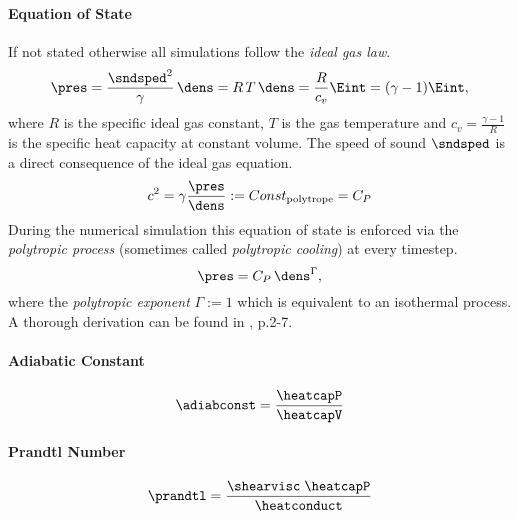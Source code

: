 \paragraph{Equation of State}
If not stated otherwise all simulations follow the \emph{ideal gas law}.
\begin{equation}
\pres = \frac{\sndsped^2}{\gamma} \, \dens = R\,T\,\dens = \frac{R}{c_v} \Eint = (\gamma - 1) \Eint,
\end{equation}
where $R$ is the specific ideal gas constant, $T$ is the gas temperature and $c_v
= \frac{\gamma - 1}{R}$ is the specific heat capacity at constant volume. The speed of sound $\sndsped$
is a direct consequence of the ideal gas equation.
\begin{equation}
c^2 = \gamma \frac{\pres}{\dens} := Const_{\text{polytrope}} = C_P
\end{equation}
During the numerical simulation this equation of state is enforced via the
\emph{polytropic process} (sometimes called \emph{polytropic cooling}) at
every timestep.
\begin{equation}
\pres = C_P \, \dens^\Gamma,
\end{equation}
where the \emph{polytropic exponent} $\Gamma := 1$ which is equivalent to an
isothermal process. A thorough derivation can be found in \cite{Horedt2004},
p.2-7.

\paragraph{Adiabatic Constant}
\begin{equation}
\label{eq:adiabconst}
    \adiabconst = \frac{\heatcapP}{\heatcapV}
\end{equation}

\paragraph{Prandtl Number}
\begin{equation}
\label{eq:prandtl}
    \prandtl = \frac{\shearvisc \; \heatcapP}{\heatconduct}
\end{equation}

